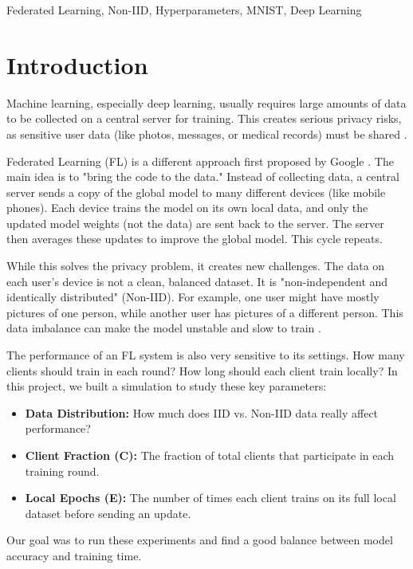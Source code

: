 \documentclass[conference]{IEEEtran}
\begin{document}
\begin{IEEEkeywords}
Federated Learning, Non-IID, Hyperparameters, MNIST, Deep Learning
\end{IEEEkeywords}


\section{Introduction}
Machine learning, especially deep learning, usually requires large amounts of data to be collected on a central server for training. This creates serious privacy risks, as sensitive user data (like photos, messages, or medical records) must be shared \cite{b1}.

Federated Learning (FL) is a different approach first proposed by Google \cite{b2}. The main idea is to "bring the code to the data." Instead of collecting data, a central server sends a copy of the global model to many different devices (like mobile phones). Each device trains the model on its own local data, and only the updated model weights (not the data) are sent back to the server. The server then averages these updates to improve the global model. This cycle repeats.

While this solves the privacy problem, it creates new challenges. The data on each user's device is not a clean, balanced dataset. It is "non-independent and identically distributed" (Non-IID). For example, one user might have mostly pictures of one person, while another user has pictures of a different person. This data imbalance can make the model unstable and slow to train \cite{b3}.

The performance of an FL system is also very sensitive to its settings. How many clients should train in each round? How long should each client train locally? In this project, we built a simulation to study these key parameters:
\begin{itemize}
    \item \textbf{Data Distribution:} How much does IID vs. Non-IID data really affect performance?
    \item \textbf{Client Fraction (C):} The fraction of total clients that participate in each training round.
    \item \textbf{Local Epochs (E):} The number of times each client trains on its full local dataset before sending an update.
\end{itemize}
Our goal was to run these experiments and find a good balance between model accuracy and training time.
\end{document}
